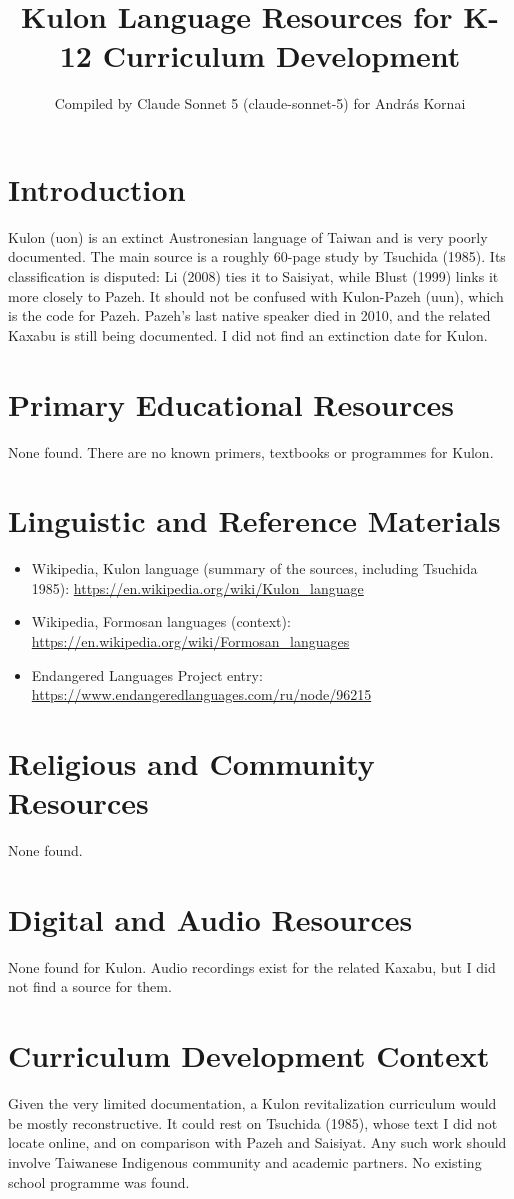 \documentclass[12pt]{article}
\title{Kulon Language Resources for K-12 Curriculum Development}
\author{Compiled by Claude Sonnet 5 (claude-sonnet-5) for Andr\'as Kornai}
\date{}
\begin{document}
\maketitle

\section{Introduction}
Kulon (uon) is an extinct Austronesian language of Taiwan and is very poorly documented. The main source is a roughly 60-page study by Tsuchida (1985). Its classification is disputed: Li (2008) ties it to Saisiyat, while Blust (1999) links it more closely to Pazeh. It should not be confused with Kulon-Pazeh (uun), which is the code for Pazeh. Pazeh's last native speaker died in 2010, and the related Kaxabu is still being documented. I did not find an extinction date for Kulon.

\section{Primary Educational Resources}
None found. There are no known primers, textbooks or programmes for Kulon.

\section{Linguistic and Reference Materials}
\begin{itemize}
\item Wikipedia, Kulon language (summary of the sources, including Tsuchida 1985): \url{https://en.wikipedia.org/wiki/Kulon_language}
\item Wikipedia, Formosan languages (context): \url{https://en.wikipedia.org/wiki/Formosan_languages}
\item Endangered Languages Project entry: \url{https://www.endangeredlanguages.com/ru/node/96215}
\end{itemize}

\section{Religious and Community Resources}
None found.

\section{Digital and Audio Resources}
None found for Kulon. Audio recordings exist for the related Kaxabu, but I did not find a source for them.

\section{Curriculum Development Context}
Given the very limited documentation, a Kulon revitalization curriculum would be mostly reconstructive. It could rest on Tsuchida (1985), whose text I did not locate online, and on comparison with Pazeh and Saisiyat. Any such work should involve Taiwanese Indigenous community and academic partners. No existing school programme was found.
\end{document}

